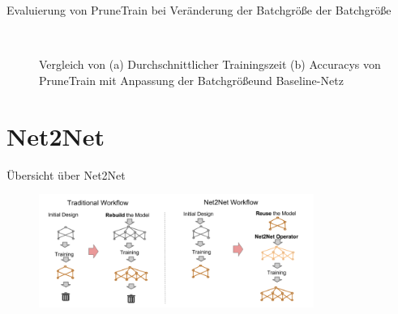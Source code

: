 \documentclass[10pt]{beamer}
\begin{document}
\begin{frame}{Evaluierung von PruneTrain bei Veränderung der Batchgröße der Batchgröße}
 
 \begin{figure}
     \centering
     \hfill
     \\
     \caption{Vergleich von (a) Durchschnittlicher Trainingszeit (b) Accuracys von PruneTrain mit Anpassung der Batchgrößeund Baseline-Netz}
     \label{abb:bSize}
\end{figure}
\end{frame}

\section{Net2Net}

\begin{frame}{Übersicht über Net2Net}
\begin{figure}[h]
 \centering
 \includegraphics[width=0.8\textwidth]{images/net2net.png}
\end{figure}
\end{frame}
\end{document}
